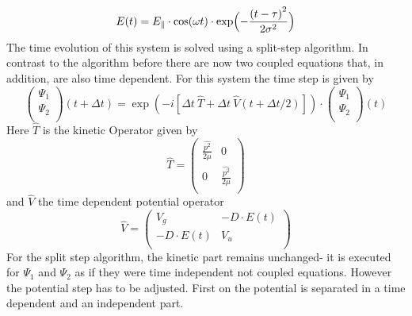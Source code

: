 \documentclass[12pt]{article}
\newcommand{\psiv}{\begin{pmatrix}\Psi_1\\ \Psi_2\\ \end{pmatrix}}
\begin{document}
\begin{equation}
   E(t)=E_\parallel \cdot \cos(\omega t) \cdot \exp \Bigl( -\frac{\left(t-\tau\right)^2}{2\sigma^2} \Bigr)
\end{equation}
The time evolution of this system is solved using a split-step algorithm. In contrast to the algorithm before there are now  two coupled equations that, in addition, are also time dependent. For this system the time step is given by \cite{doi:10.1063/1.465362}
\begin{equation}
\psiv (t+\Delta t)= \exp(-i[\Delta t\ \hat{T} + \Delta t\ \hat{V}(t+\Delta t /2)]) \cdot \psiv(t)
\end{equation}
Here  $\hat{T}$   is the kinetic Operator given by
\begin{equation}\hat T=
\begin{pmatrix}
\frac{\hat{p^2}}{2\mu}& 0\\
0 & \frac{\hat{p^2}}{2\mu}\\
\end{pmatrix}
\end{equation}
and $\hat{V}$ the time dependent potential operator
\begin{equation}
\hat V=
\begin{pmatrix}
V_g & -D\cdot E(t)\\
-D\cdot E(t) & V_u\\
\end{pmatrix}
\end{equation}
For the split step algorithm, the kinetic part remains unchanged- it is executed for $\Psi_1$ and $\Psi_2$ as if they were time independent not coupled equations.
However the potential step has to be adjusted. First on the potential is separated in a time dependent and an independent part.
\end{document}
